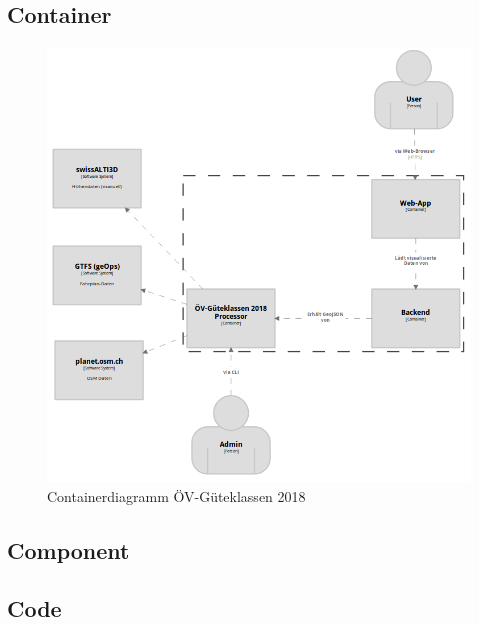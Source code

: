 \subsection{Container}
\label{Architektur:Container}

\begin{figure}[ht]
    \centering
    \includegraphics[width=1\linewidth]{projectdoc/img/container-diagram}
    \caption[ht]{}
    \caption[Containerdiagramm]{Containerdiagramm ÖV-Güteklassen 2018}
    \label{fig:container-diagram}
\end{figure}



\subsection{Component}
\label{Architektur:Component}


\subsection{Code}
\label{Architektur:Code}

